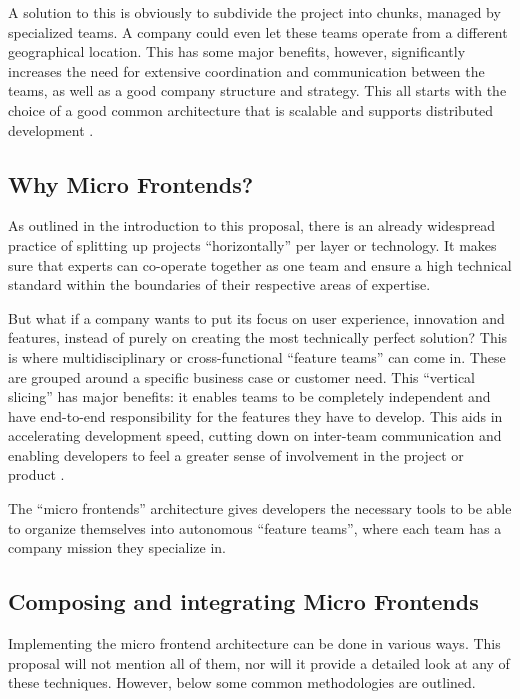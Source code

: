 A solution to this is obviously to subdivide the project into chunks, managed by
specialized teams. A company could even let these teams operate from a different
geographical location. This has some major benefits, however, significantly
increases the need for extensive coordination and communication between the
teams, as well as a good company structure and strategy. This all starts with
the choice of a good common architecture that is scalable and supports
distributed development \autocite{Yuhong_2008}. 

\subsection{Why Micro Frontends?}
As outlined in the introduction to this proposal, there is an already widespread
practice of splitting up projects ``horizontally'' per layer or technology. It
makes sure that experts can co-operate together as one team and ensure a high
technical standard within the boundaries of their respective areas of expertise.

But what if a company wants to put its focus on user experience, innovation and
features, instead of purely on creating the most technically perfect solution?
This is where multidisciplinary or cross-functional ``feature teams'' can come
in. These are grouped around a specific business case or customer need. This
``vertical slicing'' has major benefits: it enables teams to be completely
independent and have end-to-end responsibility for the features they have to
develop. This aids in accelerating development speed, cutting down on inter-team
communication and enabling developers to feel a greater sense of involvement in
the project or product \autocite{LarmanVodde_2008}.

The ``micro frontends'' architecture gives developers the necessary tools to be
able to organize themselves into autonomous ``feature teams'', where each team
has a company mission they specialize in.
\autocite{Geers_2020}

\subsection{Composing and integrating Micro Frontends}
Implementing the micro frontend architecture can be done in various ways. This
proposal will not mention all of them, nor will it provide a detailed look at
any of these techniques. However, below some common methodologies are outlined.
\autocite{Geers_2020} \autocite{Peltonen_etal_2020} \autocite{Pavlenko_etal_2020}

